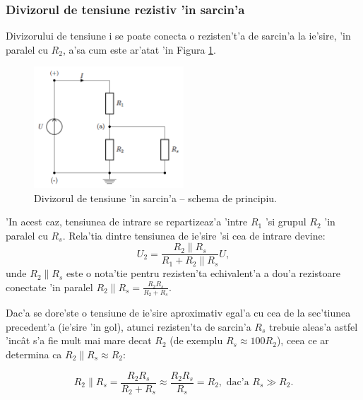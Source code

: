 \subsubsection*{\color{blue} Divizorul de tensiune rezistiv 'in sarcin'a} %

Divizorului de tensiune i se poate conecta o rezisten't'a de sarcin'a la ie'sire, 'in paralel cu $R_2$, a'sa cum este ar'atat 'in Figura \ref{fig:divizor_sarcina_schema}.

\begin{figure}[!b]
	\centering
		\includegraphics[width=0.5\textwidth]{laborator_01/figuri/scheme_divizor_sarcina}
	\caption{Divizorul de tensiune 'in sarcin'a -- schema de principiu.}
	\label{fig:divizor_sarcina_schema}
\end{figure}

'In acest caz, tensiunea de intrare se repartizeaz'a 'intre $R_1$ 'si grupul $R_2$ 'in paralel cu $R_s$. Rela'tia dintre tensiunea de ie'sire 'si cea de intrare devine:
\begin{equation} \label{eq:tensiune_iesire_sarcina}
U_2 = \frac{R_2\parallel R_s}{R_1+R_2\parallel R_s}U,
\end{equation}
unde $R_2\parallel R_s$ este o nota'tie pentru rezisten'ta echivalent'a a dou'a rezistoare conectate 'in paralel $R_2\parallel R_s = \frac{R_2R_s}{R_2+R_s}$.

Dac'a se dore'ste o tensiune de ie'sire aproximativ egal'a cu cea de la sec'tiunea precedent'a (ie'sire 'in gol), atunci rezisten'ta de sarcin'a $R_s$ trebuie aleas'a astfel 'inc\^at s'a fie mult mai mare decat $R_2$ (de exemplu $R_s \approx 100R_2$), ceea ce ar determina ca $R_2\parallel R_s \approx R_2$:

\begin{equation}\label{eq:sarcina}
R_2 \parallel R_s = \frac{R_2 R_s}{R_2+R_s}\approx \frac{R_2 R_s}{R_s}=R_2, \text{ dac'a } R_s \gg R_2.
\end{equation}

